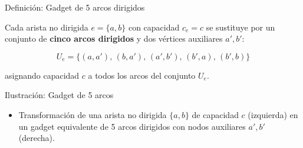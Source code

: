 \documentclass[
  ignorenonframetext,
]{beamer}
\providecommand{\tightlist}{%
  \setlength{\itemsep}{0pt}\setlength{\parskip}{0pt}}
\begin{document}
\begin{frame}{Definición: Gadget de 5 arcos dirigidos}
\label{definiciuxf3n-gadget-de-5-arcos-dirigidos}
\begin{tcolorbox}[enhanced jigsaw, opacityback=0, breakable, title=\textcolor{quarto-callout-note-color}{\faInfo}\hspace{0.5em}{Transformación de aristas no dirigidas (Gadget de 5 arcos)}, colback=white, colbacktitle=quarto-callout-note-color!10!white, bottomrule=.15mm, opacitybacktitle=0.6, coltitle=black, bottomtitle=1mm, leftrule=.75mm, colframe=quarto-callout-note-color-frame, toptitle=1mm, titlerule=0mm, rightrule=.15mm, left=2mm, arc=.35mm, toprule=.15mm]

Cada arista no dirigida \(e = \{a, b\}\) con capacidad \(c_e = c\) se
sustituye por un conjunto de \textbf{cinco arcos dirigidos} y dos
vértices auxiliares \(a', b'\):

\[
U_e = \{ (a, a'), \, (b, a'), \, (a', b'), \, (b', a), \, (b', b) \}
\]

asignando capacidad \(c\) a todos los arcos del conjunto \(U_e\).

\end{tcolorbox}
\end{frame}

\begin{frame}{Ilustración: Gadget de 5 arcos}
\label{ilustraciuxf3n-gadget-de-5-arcos}
\begin{itemize}
\tightlist
\item
  Transformación de una arista no dirigida \(\{a, b\}\) de capacidad
  \(c\) (izquierda) en un gadget equivalente de 5 arcos dirigidos con
  nodos auxiliares \(a', b'\) (derecha).
\end{itemize}
\end{frame}
\end{document}
